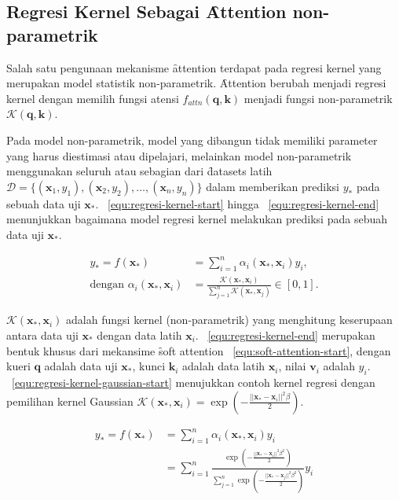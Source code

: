 \subsection{Regresi Kernel Sebagai \f{Attention} non-parametrik}
\label{sec:regresi-kernel}

Salah satu pengunaan mekanisme \f{attention} terdapat pada regresi kernel yang merupakan model statistik non-parametrik. \f{Attention} berubah menjadi regresi kernel dengan memilih fungsi atensi $f_{attn}(\mathbf{q}, \mathbf{k})$ menjadi fungsi non-parametrik $\mathcal{K}(\mathbf{q}, \mathbf{k})$.

Pada model non-parametrik, model yang dibangun tidak memiliki parameter yang harus diestimasi atau dipelajari, melainkan model non-parametrik menggunakan seluruh atau sebagian dari \f{datasets} latih $\mathcal{D} = \{(\mathbf{x}_1, y_1), (\mathbf{x}_2, y_2), \dots, (\mathbf{x}_n, y_n)\}$ dalam memberikan prediksi $y_*$ pada sebuah data uji $\mathbf{x}_*$. \equ~\ref{equ:regresi-kernel-start} hingga \equ~\ref{equ:regresi-kernel-end} menunjukkan bagaimana model regresi kernel melakukan prediksi pada sebuah data uji $\mathbf{x}_*$.

\begin{align}
    \label{equ:regresi-kernel-start}
    y_{*} = f(\mathbf{x}_{*}) &= \sum_{i=1}^{n} \alpha_{i}(\mathbf{x}_{*},\mathbf{x}_i) y_i, \\
    \label{equ:regresi-kernel-end}
    \text{dengan } \alpha_{i}(\mathbf{x}_{*},\mathbf{x}_i) &= \frac{\mathcal{K}(\mathbf{x}_{*},\mathbf{x}_i)}{\sum_{j=1}^{n} \mathcal{K}(\mathbf{x}_{*},\mathbf{x}_j)} \in [0, 1].
\end{align}

$\mathcal{K}(\mathbf{x}_{*},\mathbf{x}_i)$ adalah fungsi kernel (non-parametrik) yang menghitung keserupaan antara data uji $\mathbf{x}_{*}$ dengan data latih $\mathbf{x}_i$. \equ~\ref{equ:regresi-kernel-end} merupakan bentuk khusus dari mekansime \f{soft attention} \equ~\ref{equ:soft-attention-start}, dengan kueri $\mathbf{q}$ adalah data uji $\mathbf{x}_{*}$, kunci $\mathbf{k}_i$ adalah data latih $\mathbf{x}_i$, nilai $\mathbf{v}_i$ adalah $y_i$. \equ~\ref{equ:regresi-kernel-gaussian-start} menujukkan contoh kernel regresi dengan pemilihan kernel Gaussian $\mathcal{K}(\mathbf{x}_{*},\mathbf{x}_i) = \exp(-\frac{||\mathbf{x}_{*} - \mathbf{x}_i||^2 \beta}{2})$.

\begin{align}
    \label{equ:regresi-kernel-gaussian-start}
    y_{*} = f(\mathbf{x}_{*}) &= \sum_{i=1}^{n} \alpha_{i}(\mathbf{x}_{*},\mathbf{x}_i) y_i	\\
    &= \sum_{i=1}^{n} \frac{\exp\left(-\frac{||\mathbf{x}_{*}-\mathbf{x}_i||^2 \beta^2}{2}\right)}{\sum_{j=1}^{n} \exp\left(-\frac{||\mathbf{x}_{*}-\mathbf{x}_j||^2 \beta^2}{2}\right)} y_i
\end{align}